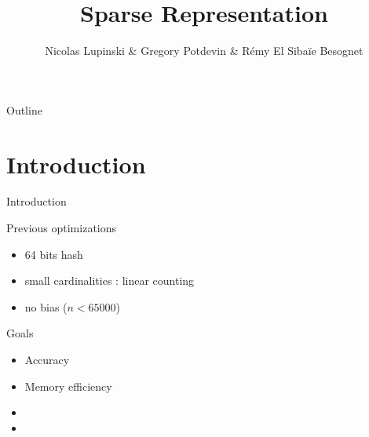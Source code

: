 \documentclass{beamer}
\title{Sparse Representation}
\author{Nicolas Lupinski \& Gregory Potdevin \& Rémy El Sibaïe Besognet}
\begin{document}
\begin{frame}
  \titlepage  
\end{frame}

\begin{frame}{Outline}
  \tableofcontents
\end{frame}


\section{Introduction}
\begin{frame}{Introduction}

  \begin{block}{Previous optimizations}
    \begin{itemize}
      \item 64 bits hash
      \item small cardinalities : linear counting
      \item no bias ($n < 65000$)
    \end{itemize}
  \end{block}


  \begin{block}{Goals}
    \begin{itemize}
      \item Accuracy
      \item Memory efficiency
      \item {} 
      \item {} 
    \end{itemize}
  \end{block}

\end{frame}

\end{document}
